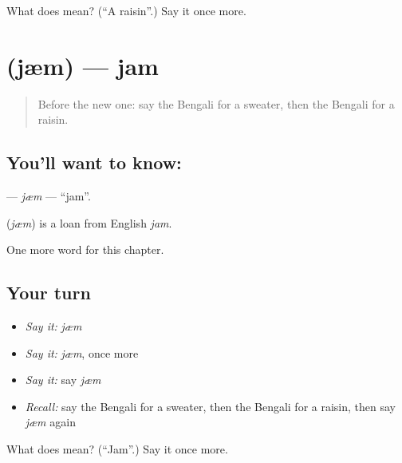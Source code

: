 \begin{tcolorbox}[breakable,colback=teal!4,colframe=teal!35!black,title={Before you move on}]
What does  mean? (\textquotedblleft{}A raisin\textquotedblright{}.) Say it once more.
\end{tcolorbox}
\section[\texorpdfstring{\bn{জ্যাম} (jæm)}{জ্যাম (jæm)}]{ (jæm) — jam}

\label{lesson:BN-C165-jm}



\begin{quote}
Before the new one: say the Bengali for a sweater, then the Bengali for a raisin.
\end{quote}

\subsection*{You'll want to know: }
\textbf{} — \emph{jæm} — \textquotedblleft{}jam\textquotedblright{}.

\begin{cousinweb}
\textbf{} (\emph{jæm}) is a loan from English \emph{jam}.
\end{cousinweb}

\begin{grammarlens}[title={What you've built}]
One more word for this chapter.
\end{grammarlens}

\subsection*{Your turn}
\begin{itemize}
\raggedright
  \item \emph{Say it:} \emph{jæm}
  \item \emph{Say it:} \emph{jæm}, once more
  \item \emph{Say it:} say \emph{jæm}
  \item \emph{Recall:} say the Bengali for a sweater, then the Bengali for a raisin, then say \emph{jæm} again
\end{itemize}

\begin{tcolorbox}[breakable,colback=teal!4,colframe=teal!35!black,title={Before you move on}]
What does  mean? (\textquotedblleft{}Jam\textquotedblright{}.) Say it once more.
\end{tcolorbox}
